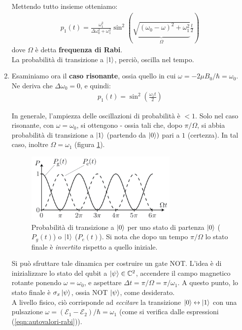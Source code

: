 \documentclass[../../InformazioneQuantistica.tex]{subfiles}
\begin{document}
\begin{enumerate}
Mettendo tutto insieme otteniamo:
\begin{align*}
    p_1(t) = \frac{\omega_1^2}{\Delta \omega_0^2 + \omega_1^2} \sin^2 \left(\underbrace{\sqrt{(\omega_0-\omega)^2 + \omega_1^2}}_{\Omega}\frac{t}{2}\right)
\end{align*}
dove $\Omega$ è detta \textbf{frequenza di Rabi}.\\
La probabilità di transizione a $\Ket{1}$, perciò, oscilla nel tempo.\\

\item Esaminiamo ora il \textbf{caso risonante}, ossia quello in cui $\omega = -2\mu B_0/\hbar = \omega_0$. Ne deriva che $\Delta \omega_0 = 0$, e quindi:
\begin{align*}
    p_1(t) = \sin^2 \left(\frac{\omega_1 t}{2}\right)
\end{align*}

In generale, l'ampiezza delle oscillazioni di probabilità è $<1$. Solo nel caso risonante, con $\omega = \omega_0$, si ottengono  - ossia tali che, dopo $\pi/\Omega$, si abbia probabilità di transizione a $\Ket{1}$ (partendo da $\Ket{0})$ pari a $1$ (certezza). In tal caso, inoltre $\Omega = \omega_1$ (figura \ref{fig:plot-rabi}).

\begin{figure}[H]
    \centering
    \includegraphics[width=0.7\textwidth]{Immagini/7_3/rabi.PNG}
    \caption{Probabilità di transizione a $\Ket{0}$ per uno stato di partenza $\Ket{0}$ ($P_g(t)$) o $\Ket{1}$ ($P_e(t)$). Si nota che dopo un tempo $\pi/\Omega$ lo stato finale è \textit{invertito} rispetto a quello iniziale.}
    \label{fig:plot-rabi}
\end{figure}

Si può sfruttare tale dinamica per costruire un gate NOT. L'idea è di inizializzare lo stato del qubit a $\Ket{\psi} \in \mathbb{C}^2$, accendere il campo magnetico rotante ponendo $\omega = \omega_0$, e aspettare $\Delta t= \pi/\Omega = \pi/\omega_1$. A questo punto, lo stato finale è $\sigma_x \Ket{\psi}$, ossia NOT $\Ket{\psi}$, come desiderato.\\

A livello fisico, ciò corrisponde ad \textit{eccitare} la transizione $\Ket{0} \leftrightarrow \Ket{1}$ con una pulsazione $\omega = (\mathcal{E}_1-\mathcal{E}_2)/\hbar = \omega_1$ (come si verifica dalle espressioni (\ref{eqn:autovalori-rabi})).
\end{enumerate}
\end{document}
